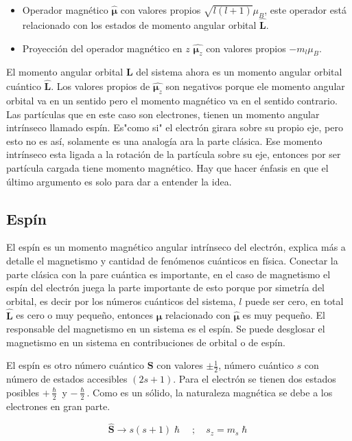 \documentclass[11pt,fleqn]{book}
\renewcommand{\vec}[1]{\mathbf{#1}}
\begin{document}
\begin{itemize}
    \item Operador magnético $\hat{\vec{\mu}}$ con valores propios $\sqrt{l(l+1)}\mu_{B}$, este operador está relacionado con los estados de momento angular orbital $\hat{\vec{L}}$.
    \item Proyección del operador magnético en $z$ $\hat{\vec{\mu}_{z}}$ con valores propios $-m_{l}\mu_{B}$.
\end{itemize}

El momento angular orbital $\vec{L}$ del sistema ahora es un momento angular orbital cuántico $\hat{\vec{L}}$. Los valores propios de $\hat{\vec{\mu}_{z}}$ son negativos porque ele momento angular orbital va  en un sentido pero el momento magnético va en el sentido contrario. Las partículas que en este caso son electrones, tienen un momento angular intrínseco llamado espín. Es"como si" el electrón girara sobre su propio eje, pero esto no es así, solamente es una analogía ara la parte clásica. Ese momento intrínseco esta ligada a la rotación de la partícula sobre su eje, entonces por ser partícula cargada tiene momento magnético. Hay que hacer énfasis en que el último argumento es solo para dar a entender la idea.

\subsection{Espín}

El espín es un momento magnético angular intrínseco del electrón, explica más a detalle el magnetismo y cantidad de fenómenos cuánticos en física. Conectar la parte clásica con la pare cuántica es importante, en el caso de magnetismo el espín del electrón juega la parte importante de esto porque por simetría del orbital, es decir por los números cuánticos del sistema, $l$ puede ser cero, en total $\hat{\vec{L}}$ es cero o muy pequeño, entonces $\vec{\mu}$ relacionado con $\hat{\vec{\mu}}$ es muy pequeño. El responsable del magnetismo en un sistema es el espín. Se puede desglosar  el magnetismo en un sistema en contribuciones de orbital o de espín.

El espín es otro número cuántico $\vec{S}$ con valores $\pm\frac{1}{2}$, número cuántico $s$ con número de estados accesibles $(2s+1)$. Para el electrón se tienen dos estados posibles $+\frac{\hslash}{2}$ y $-\frac{\hslash}{2}$. Como es un sólido, la naturaleza magnética se debe a los electrones en gran parte. 

\begin{equation*}
    \hat{\vec{S}}\longrightarrow s(s+1)\hslash\quad;\quad s_{z}=m_{s}\hslash
\end{equation*}
\end{document}
